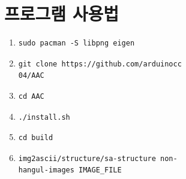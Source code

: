 \documentclass[conference]{IEEEtran}
\begin{document}
\section{프로그램 사용법}
\begin{enumerate}
\item \begin{verbatim}sudo pacman -S libpng eigen\end{verbatim}
\item \begin{verbatim}git clone https://github.com/arduinocc
04/AAC\end{verbatim}
\item \begin{verbatim}cd AAC\end{verbatim}
\item \begin{verbatim}./install.sh\end{verbatim}
\item \begin{verbatim}cd build \end{verbatim}
\item \begin{verbatim}img2ascii/structure/sa-structure non-
hangul-images IMAGE_FILE\end{verbatim}
\end{enumerate}



\end{document}
